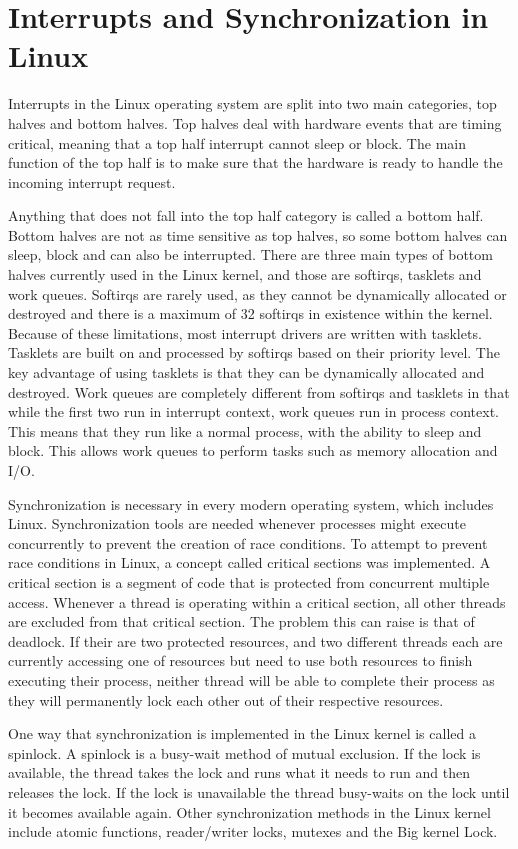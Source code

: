 \documentclass[10pt,serif,draftclsnofoot,onecolumn]{IEEEtran}
\begin{document}
	\section{Interrupts and Synchronization in Linux}
	\par
			Interrupts in the Linux operating system are split into two main categories, top halves and bottom halves. Top halves deal with hardware events that are timing critical, meaning that a top half interrupt cannot sleep or block. The main function of the top half is to make sure that the hardware is ready to handle the incoming interrupt request.
	\newline
	\par
			Anything that does not fall into the top half category is called a bottom half. Bottom halves are not as time sensitive as top halves, so some bottom halves can sleep, block and can also be interrupted. There are three main types of bottom halves currently used in the Linux kernel, and those are softirqs, tasklets and work queues\cite{2}. Softirqs are rarely used, as they cannot be dynamically allocated or destroyed and there is a maximum of 32 softirqs in existence within the kernel. Because of these limitations, most interrupt drivers are written with tasklets. Tasklets are built on and processed by softirqs based on their priority level. The key advantage of using tasklets is that they can be dynamically allocated and destroyed\cite{2}. Work queues are completely different from softirqs and tasklets in that while the first two run in interrupt context, work queues run in process context. This means that they run like a normal process, with the ability to sleep and block. This allows work queues to perform tasks such as memory allocation and I/O.
	\newline
	\par
			Synchronization is necessary in every modern operating system, which includes Linux. Synchronization tools are needed whenever processes might execute concurrently to prevent the creation of race conditions. To attempt to prevent race conditions in Linux, a concept called critical sections was implemented. A critical section is a segment of code that is protected from concurrent multiple access\cite{3}. Whenever a thread is operating within a critical section, all other threads are excluded from that critical section. The problem this can raise is that of deadlock. If their are two protected resources, and two different threads each are currently accessing one of resources but need to use both resources to finish executing their process, neither thread will be able to complete their process as they will permanently lock each other out of their respective resources.
	\newline
	\par
			One way that synchronization is implemented in the Linux kernel is called a spinlock. A spinlock is a busy-wait method of mutual exclusion. If the lock is available, the thread takes the lock and runs what it needs to run and then releases the lock. If the lock is unavailable the thread busy-waits on the lock until it becomes available again\cite{3}. Other synchronization methods in the Linux kernel include atomic functions, reader/writer locks, mutexes and the Big kernel Lock.
\end{document}
